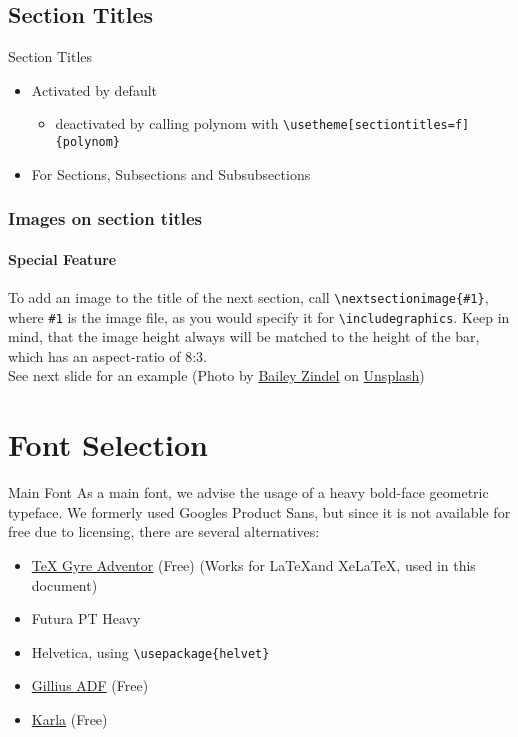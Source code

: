 \documentclass[fragile=singleslide]{beamer}
\begin{document}
\subsection{Section Titles}
\begin{frame}[fragile=singleslide]{Section Titles}
  \begin{itemize}
  \item Activated by default
    \begin{itemize}
    \item deactivated by calling polynom with \verb|\usetheme[sectiontitles=f]{polynom}|
    \end{itemize}
  \item For Sections, Subsections and Subsubsections
  \end{itemize}
\end{frame}

\begin{frame}[fragile=singleslide]
  \frametitle{Images on section titles}
  \framesubtitle{Special Feature}
  To add an image to the title of the next section, call
  \verb|\nextsectionimage{#1}|, where
  \verb|#1| is the image file, as you would specify it
  for \verb|\includegraphics|. Keep in mind, that the image height
  \alert{always} will be matched to the height of the bar, which has
  an aspect-ratio of 8:3.\\

  See next slide for an example (Photo by \href{https://unsplash.com/photos/NRQV-hBF10M}{Bailey Zindel} on \href{https://unsplash.com/}{Unsplash})
\end{frame}

\section{Font Selection}
\begin{frame}[fragile=singleslide]{Main Font}
  As a main font, we advise the usage of a heavy bold-face geometric typeface.  
  We formerly used Googles Product Sans, but since it is not available for free
  due to licensing, there are several alternatives:  
  \begin{itemize}
  \item \href{http://www.tug.dk/FontCatalogue/texgyreadventor/}{\TeX
    Gyre Adventor} (Free) (Works for \LaTeX and Xe\LaTeX, used in this document)
  \item Futura PT Heavy
  \item Helvetica, using \verb|\usepackage{helvet}|
  \item \href{https://www.1001fonts.com/gillius-adf-font.html}{Gillius
      ADF} (Free)
  \item \href{https://fonts.google.com/specimen/Karla}{Karla} (Free)
  \end{itemize}
\end{frame}
\end{document}
